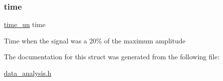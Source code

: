 \subsubsection{\texorpdfstring{time}{time}}
{\footnotesize\ttfamily \mbox{\hyperlink{data__analysis_8h_a6bcac60981154f19ecdcba9856b481cc}{time\+\_\+un}} time}

Time when the signal was a 20\% of the maximum amplitude 

The documentation for this struct was generated from the following file\+:\begin{DoxyCompactItemize}
\item 
\mbox{\hyperlink{data__analysis_8h}{data\+\_\+analysis.\+h}}\end{DoxyCompactItemize}
